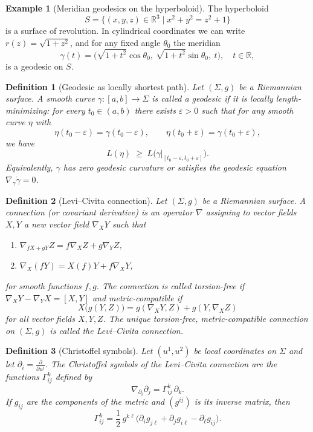 \documentclass[12pt,a4paper]{article}
\theoremstyle{plain}
\newtheorem{definition}{Definition}
\theoremstyle{definition}      %
\newtheorem*{Example}{Example}
\begin{document}
	\begin{Example}[Meridian geodesics on the hyperboloid]
		The hyperboloid
		\[
		S=\{(x,y,z)\in\mathbb R^3 \mid x^2 + y^2 = z^2 + 1\}
		\]
		is a surface of revolution. In cylindrical coordinates we can write
		$r(z)=\sqrt{1+z^2}$, and for any fixed angle $\theta_0$ the meridian
		\[
		\gamma(t) =
		\bigl(\sqrt{1+t^2}\cos\theta_0,\ \sqrt{1+t^2}\sin\theta_0,\ t\bigr),
		\quad t\in\mathbb R,
		\]
		is a geodesic on $S$.
	\end{Example}
	\begin{definition}[Geodesic as locally shortest path]
		Let $(\Sigma,g)$ be a Riemannian surface. A smooth curve
		$\gamma:[a,b]\to\Sigma$ is called a \emph{geodesic} if it is
		locally length-minimizing: for every $t_0\in(a,b)$ there exists
		$\varepsilon>0$ such that for any smooth curve $\eta$ with
		\[
		\eta(t_0-\varepsilon)=\gamma(t_0-\varepsilon),\qquad
		\eta(t_0+\varepsilon)=\gamma(t_0+\varepsilon),
		\]
		we have
		\[
		L(\eta)\;\ge\;L\bigl(\gamma|_{[t_0-\varepsilon,t_0+\varepsilon]}\bigr).
		\]
		Equivalently, $\gamma$ has zero geodesic curvature or satisfies
		the geodesic equation $\nabla_{\dot\gamma}\dot\gamma=0$.
	\end{definition}
	
	\begin{definition}[Levi--Civita connection]
		Let $(\Sigma,g)$ be a Riemannian surface.
		A \emph{connection} (or covariant derivative) is an operator
		$\nabla$ assigning to vector fields $X,Y$ a new vector field
		$\nabla_X Y$ such that
		\begin{enumerate}
			\item $\nabla_{fX+gY}Z = f\nabla_X Z + g\nabla_Y Z$,
			\item $\nabla_X(fY) = X(f)Y + f\nabla_X Y$,
		\end{enumerate}
		for smooth functions $f,g$.
		The connection is called \emph{torsion-free} if
		$\nabla_X Y - \nabla_Y X = [X,Y]$ and \emph{metric-compatible} if
		\[
		X\bigl(g(Y,Z)\bigr) =
		g(\nabla_X Y,Z)+g(Y,\nabla_X Z)
		\]
		for all vector fields $X,Y,Z$.
		The unique torsion-free, metric-compatible connection on
		$(\Sigma,g)$ is called the \emph{Levi--Civita connection}.
	\end{definition}
	
	\begin{definition}[Christoffel symbols]
		Let $(u^1,u^2)$ be local coordinates on $\Sigma$ and let
		$\partial_i=\frac{\partial}{\partial u^i}$.
		The \emph{Christoffel symbols} of the Levi--Civita connection are
		the functions $\Gamma^k_{ij}$ defined by
		\[
		\nabla_{\partial_i}\partial_j
		= \Gamma^k_{ij}\,\partial_k.
		\]
		If $g_{ij}$ are the components of the metric and $(g^{ij})$ is its
		inverse matrix, then
		\[
		\Gamma^k_{ij}
		=
		\frac12\,g^{k\ell}\bigl(
		\partial_i g_{j\ell} + \partial_j g_{i\ell} - \partial_\ell g_{ij}
		\bigr).
		\]
	\end{definition}
	
\end{document}
